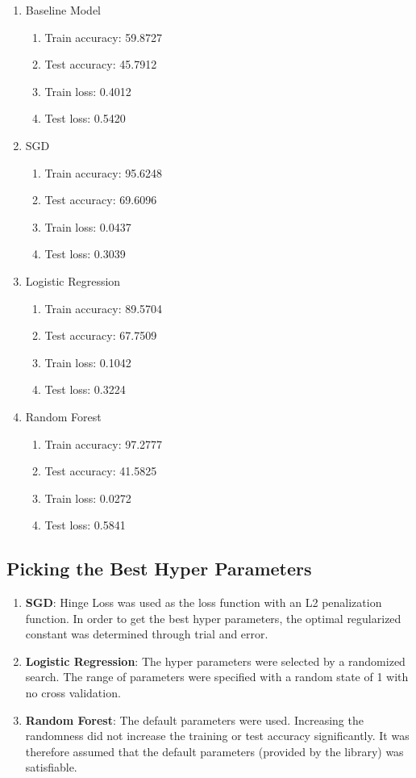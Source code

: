 \documentclass[10pt]{article}
\begin{document}
\begin{enumerate}
\item Baseline Model
	\begin{enumerate}
	\item Train accuracy: 59.8727
	\item Test accuracy: 45.7912
	\item Train loss: 0.4012
	\item Test loss: 0.5420
	\end{enumerate}

\item SGD
	\begin{enumerate}
	\item Train accuracy: 95.6248
	\item Test accuracy: 69.6096
	\item Train loss: 0.0437
	\item Test loss: 0.3039
	\end{enumerate}	

\item Logistic Regression
\begin{enumerate}
	\item Train accuracy: 89.5704
	\item Test accuracy: 67.7509
	\item Train loss: 0.1042
	\item Test loss: 0.3224
\end{enumerate}

\item Random Forest
\begin{enumerate}
	\item Train accuracy: 97.2777
	\item Test accuracy: 41.5825
	\item Train loss: 0.0272
	\item Test loss: 0.5841
\end{enumerate}
\end{enumerate}

\subsection{Picking the Best Hyper Parameters}
\begin{enumerate}
\item \textbf{SGD}: Hinge Loss was used as the loss function with an L2 penalization function. In order to get the best hyper parameters, the optimal regularized constant was determined through trial and error.

\item \textbf{Logistic Regression}: The hyper parameters were selected by a randomized search. The range of parameters were specified with a random state of 1 with no cross validation.

\item \textbf{Random Forest}: The default parameters were used. Increasing the randomness did not increase the training or test accuracy significantly. It was therefore assumed that the default parameters (provided by the library) was satisfiable.
\end{enumerate}
\end{document}
